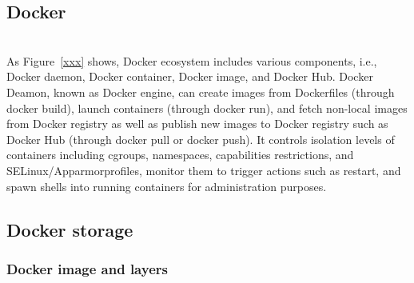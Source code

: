  
\subsection{Docker}
 
\\


As Figure~\ref{xxx} shows, Docker ecosystem includes various components, i.e., Docker daemon, Docker container, Docker image, and Docker Hub.
%
Docker Deamon, known as Docker engine, can create images from Dockerfiles (through docker build), launch containers (through docker run), and fetch non-local images from Docker registry as well as publish new images to Docker registry such as Docker Hub (through docker pull or docker push).
%
It controls isolation levels of containers including cgroups, namespaces, capabilities restrictions, and SELinux/Apparmorprofiles, monitor them to trigger actions such as restart, and spawn shells into running containers for administration purposes.
%



 
 
\subsection{Docker storage}

\subsubsection{Docker image and layers}

